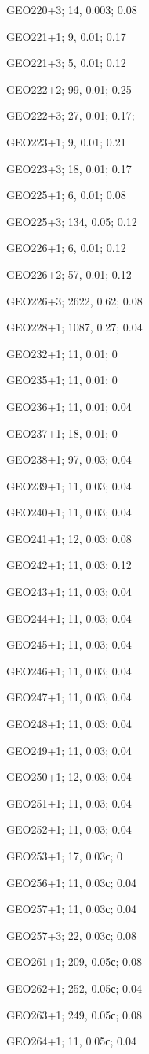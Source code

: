 GEO220+3; 14, 0.003; 0.08

GEO221+1; 9, 0.01; 0.17

GEO221+3; 5, 0.01; 0.12

GEO222+2; 99, 0.01; 0.25

GEO222+3; 27, 0.01; 0.17;

GEO223+1; 9, 0.01; 0.21

GEO223+3; 18, 0.01; 0.17

GEO225+1; 6, 0.01; 0.08

GEO225+3; 134, 0.05; 0.12

GEO226+1; 6, 0.01; 0.12

GEO226+2; 57, 0.01; 0.12

GEO226+3; 2622, 0.62; 0.08

GEO228+1; 1087, 0.27; 0.04

GEO232+1; 11, 0.01; 0

GEO235+1; 11, 0.01; 0

GEO236+1; 11, 0.01; 0.04

GEO237+1; 18, 0.01; 0

GEO238+1; 97, 0.03; 0.04

GEO239+1; 11, 0.03; 0.04

GEO240+1; 11, 0.03; 0.04

GEO241+1; 12, 0.03; 0.08

GEO242+1; 11, 0.03; 0.12

GEO243+1; 11, 0.03; 0.04

GEO244+1; 11, 0.03; 0.04

GEO245+1; 11, 0.03; 0.04

GEO246+1; 11, 0.03; 0.04

GEO247+1; 11, 0.03; 0.04

GEO248+1; 11, 0.03; 0.04

GEO249+1; 11, 0.03; 0.04

GEO250+1; 12, 0.03; 0.04

GEO251+1; 11, 0.03; 0.04

GEO252+1; 11, 0.03; 0.04

GEO253+1; 17, 0.03с; 0

GEO256+1; 11, 0.03с; 0.04

GEO257+1; 11, 0.03с; 0.04

GEO257+3; 22, 0.03с; 0.08

GEO261+1; 209, 0.05с; 0.08

GEO262+1; 252, 0.05с; 0.04

GEO263+1; 249, 0.05с; 0.08

GEO264+1; 11, 0.05с; 0.04



